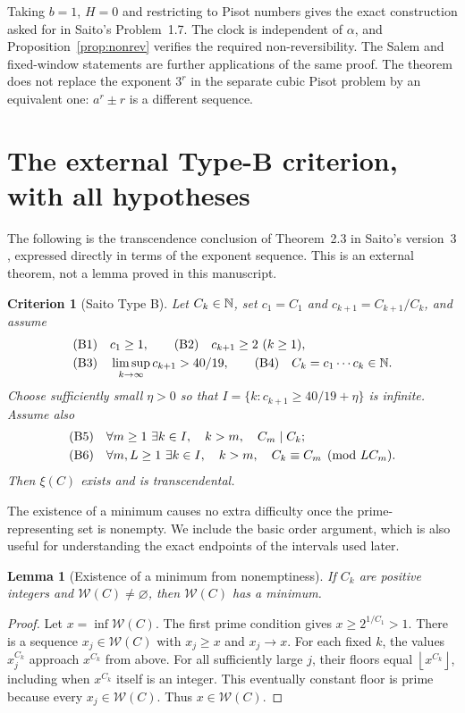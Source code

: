\documentclass[11pt,a4paper]{article}
\newtheorem{lemma}[theorem]{Lemma}
\newtheorem{criterion}[theorem]{Criterion}
\theoremstyle{definition}\newtheorem{definition}[theorem]{Definition}
\theoremstyle{remark}\newtheorem{remark}[theorem]{Remark}
\newcommand{\floor}[1]{\left\lfloor #1\right\rfloor}\newcommand{\ceil}[1]{\left\lceil #1\right\rceil}
\newcommand{\WW}{\mathcal W}
\begin{document}
Taking $b=1$, $H=0$ and restricting to Pisot numbers gives the exact
construction asked for in Saito's Problem~1.7. The clock is independent
of $\alpha$, and Proposition~\ref{prop:nonrev} verifies the required
non-reversibility. The Salem and fixed-window statements are further
applications of the same proof. The theorem does not replace the
exponent $3^r$ in the separate cubic Pisot problem by an equivalent
one: $a^r\pm r$ is a different sequence.

\section{The external Type-B criterion, with all hypotheses}
The following is the transcendence conclusion of Theorem~2.3 in
Saito's version~3 \cite{SaitoVariants}, expressed directly in terms of
the exponent sequence. This is an external theorem, not a lemma
proved in this manuscript.

\begin{criterion}[Saito Type B]\label{crit:typeB}
Let $C_k\in\mathbb N$, set $c_1=C_1$ and $c_{k+1}=C_{k+1}/C_k$, and assume
\begin{align*}
 &\textup{(B1)}\quad c_1\ge1,\qquad
 \textup{(B2)}\quad c_{k+1}\ge2\ (k\ge1),\\
 &\textup{(B3)}\quad\limsup_{k\to\infty}c_{k+1}>40/19,\qquad
 \textup{(B4)}\quad C_k=c_1\cdots c_k\in\mathbb N.
\end{align*}
Choose sufficiently small $\eta>0$ so that
$I=\{k:c_{k+1}\ge40/19+\eta\}$ is infinite. Assume also
\begin{align*}
 \textup{(B5)}\quad&\forall m\ge1\ \exists k\in I,
 \quad k>m,\quad C_m\mid C_k;\\
 \textup{(B6)}\quad&\forall m,L\ge1\ \exists k\in I,
 \quad k>m,\quad C_k\equiv C_m\pmod{LC_m}.
\end{align*}
Then $\xi(C)$ exists and is transcendental.
\end{criterion}

The existence of a minimum causes no extra difficulty once the
prime-representing set is nonempty. We include the basic order
argument, which is also useful for understanding the exact endpoints
of the intervals used later.

\begin{lemma}[Existence of a minimum from nonemptiness]\label{lem:min}
If $C_k$ are positive integers and $\WW(C)\ne\varnothing$, then
$\WW(C)$ has a minimum.
\end{lemma}
\begin{proof}
Let $x=\inf\WW(C)$. The first prime condition gives
$x\ge2^{1/C_1}>1$. There is a sequence $x_j\in\WW(C)$ with
$x_j\ge x$ and $x_j\to x$. For each fixed $k$, the values
$x_j^{C_k}$ approach $x^{C_k}$ from above. For all sufficiently
large $j$, their floors equal $\floor{x^{C_k}}$, including when
$x^{C_k}$ itself is an integer. This eventually constant floor is
prime because every $x_j\in\WW(C)$. Thus $x\in\WW(C)$.
\end{proof}
\end{document}
